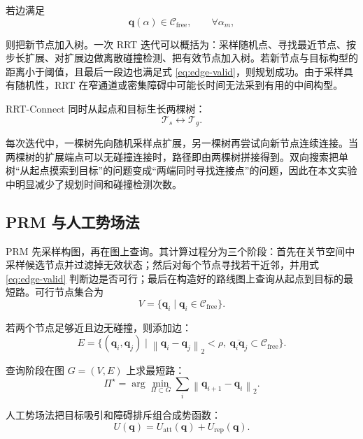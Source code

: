 \documentclass[UTF8,zihao=-4]{ctexart}
\newcommand{\norm}[1]{\left\lVert #1 \right\rVert}
\begin{document}
若边满足
\begin{equation}
  \bm q(\alpha)\in\mathcal C_{\mathrm{free}},
  \qquad
  \forall \alpha_m ,
  \label{eq:edge-valid}
\end{equation}

则把新节点加入树。一次 RRT 迭代可以概括为：采样随机点、寻找最近节点、按步长扩展、对扩展边做离散碰撞检测、把有效节点加入树。若新节点与目标构型的距离小于阈值，且最后一段边也满足式 \eqref{eq:edge-valid}，则规划成功。由于采样具有随机性，RRT 在窄通道或密集障碍中可能长时间无法采到有用的中间构型。

RRT-Connect 同时从起点和目标生长两棵树\cite{kuffner2000rrtconnect}：
\begin{equation}
  \mathcal T_s\leftrightarrow \mathcal T_g .
  \label{eq:rrt-connect-trees}
\end{equation}

每次迭代中，一棵树先向随机采样点扩展，另一棵树再尝试向新节点连续连接。当两棵树的扩展端点可以无碰撞连接时，路径即由两棵树拼接得到。双向搜索把单树“从起点摸索到目标”的问题变成“两端同时寻找连接点”的问题，因此在本文实验中明显减少了规划时间和碰撞检测次数。

\subsection{PRM 与人工势场法}
PRM 先采样构图，再在图上查询\cite{kavraki1996prm}。其计算过程分为三个阶段：首先在关节空间中采样候选节点并过滤掉无效状态；然后对每个节点寻找若干近邻，并用式 \eqref{eq:edge-valid} 判断边是否可行；最后在构造好的路线图上查询从起点到目标的最短路。可行节点集合为
\begin{equation}
  V=\{\bm q_i\mid \bm q_i\in\mathcal C_{\mathrm{free}}\}.
  \label{eq:prm-v}
\end{equation}

若两个节点足够近且边无碰撞，则添加边：
\begin{equation}
  E=\{(\bm q_i,\bm q_j)\mid \norm{\bm q_i-\bm q_j}_2<\rho,\ \overline{\bm q_i\bm q_j}\subset\mathcal C_{\mathrm{free}}\}.
  \label{eq:prm-e}
\end{equation}

查询阶段在图 $G=(V,E)$ 上求最短路：
\begin{equation}
  \Pi^\star=\arg\min_{\Pi\subset G}\sum_i\norm{\bm q_{i+1}-\bm q_i}_2 .
  \label{eq:prm-shortest}
\end{equation}

人工势场法把目标吸引和障碍排斥组合成势函数\cite{khatib1986real}：
\begin{equation}
  U(\bm q)=U_{\mathrm{att}}(\bm q)+U_{\mathrm{rep}}(\bm q).
  \label{eq:apf-total}
\end{equation}
\end{document}
